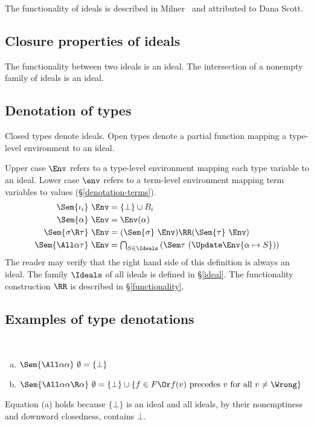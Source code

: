 \documentclass{amsart}
\theoremstyle{definition}
\begin{document}
The functionality of ideals is described in
Milner~\cite{Milner78} and attributed to Dana Scott.

\subsection{Closure properties of ideals}
The functionality between two ideals is an ideal. The
intersection of a nonempty family of ideals is an ideal.

\subsection{Denotation of types}
\label{denotation-types}
Closed types denote ideals. Open types denote a partial function
mapping a type-level environment to an ideal.

Upper case $\Env$ refers to a type-level environment mapping each
type variable to an ideal. Lower case $\env$ refers to a
term-level environment mapping term variables to values
(\S\ref{denotation-terms}).
\begin{align*}
\Sem{\iota_i}~\Env &= \{\bot\}\cup B_i\\
\Sem{\alpha}~\Env &= \Env(\alpha)\\
\Sem{\sigma\R\tau}~\Env&=
  (\Sem{\sigma}~\Env)\RR(\Sem{\tau}~\Env)\\
\Sem{\All\alpha\tau}~\Env&=
  {\textstyle\bigcap_{S\in\Ideals}}
  \left(\Sem\tau~(\Update\Env{\alpha\mapsto S})\right)
\end{align*}
The reader may verify that the right hand side of this definition
is always an ideal. The family $\Ideals$ of all ideals is defined
in \S\ref{ideal}. The functionality construction $\RR$ is
described in \S\ref{functionality}.

\subsection{Examples of type denotations}
\label{free-theorems}
~
\begin{enumerate}[(a)]
\item $\Sem{\All\alpha\alpha}~\emptyset=\{\bot\}$
\item $\Sem{\All\alpha\alpha\R\alpha}~\emptyset=\{\bot\}\cup
\{f\in F
\Or
f(v)\text{ precedes }v\text{ for all }v\neq\Wrong
\}$
\end{enumerate}

Equation (a) holds because $\{\bot\}$ is an ideal and all ideals,
by their nonemptiness and downward closedness, contains $\bot$.
\end{document}

